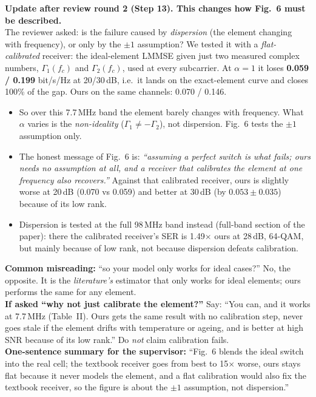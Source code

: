 \documentclass[11pt,a4paper]{article}
\begin{document}
\begin{warnbox}
\textbf{Update after review round 2 (Step 13). This changes how Fig.~6 must be described.}\\[2pt]
The reviewer asked: is the failure caused by \emph{dispersion} (the element changing with frequency), or only by the
$\pm1$ assumption? We tested it with a \emph{flat-calibrated} receiver: the ideal-element LMMSE given just two measured
complex numbers, $\Gamma_1(f_c)$ and $\Gamma_2(f_c)$, used at every subcarrier. At $\alpha=1$ it loses
\textbf{0.059 / 0.199} bit/s/Hz at 20/30\,dB, i.e.\ it lands on the exact-element curve and closes 100\% of the gap.
Ours on the same channels: 0.070 / 0.146.
\begin{itemize}
\item So over this 7.7\,MHz band the element barely changes with frequency. What $\alpha$ varies is the
\emph{non-ideality} ($\Gamma_1\neq-\Gamma_2$), not dispersion. Fig.~6 tests the $\pm1$ assumption only.
\item The honest message of Fig.~6 is: \emph{``assuming a perfect switch is what fails; ours needs no assumption at all,
and a receiver that calibrates the element at one frequency also recovers.''} Against that calibrated receiver, ours is
slightly worse at 20\,dB (0.070 vs 0.059) and better at 30\,dB (by $0.053\pm0.035$) because of its low rank.
\item Dispersion is tested at the full 98\,MHz band instead (full-band section of the paper): there the calibrated receiver's SER
is 1.49$\times$ ours at 28\,dB, 64-QAM, but mainly because of low rank, not because dispersion defeats calibration.
\end{itemize}
\end{warnbox}

\begin{warnbox}
\textbf{Common misreading:} ``so your model only works for ideal cases?'' No, the opposite. It is the \emph{literature's}
estimator that only works for ideal elements; ours performs the same for any element.\\[2pt]
\textbf{If asked ``why not just calibrate the element?''} Say: ``You can, and it works at 7.7\,MHz (Table~II). Ours
gets the same result with no calibration step, never goes stale if the element drifts with temperature or ageing, and is
better at high SNR because of its low rank.'' Do \emph{not} claim calibration fails.\\[2pt]
\textbf{One-sentence summary for the supervisor:} ``Fig.~6 blends the ideal switch into the real cell; the textbook
receiver goes from best to 15$\times$ worse, ours stays flat because it never models the element, and a flat calibration
would also fix the textbook receiver, so the figure is about the $\pm1$ assumption, not dispersion.''
\end{warnbox}
\end{document}
